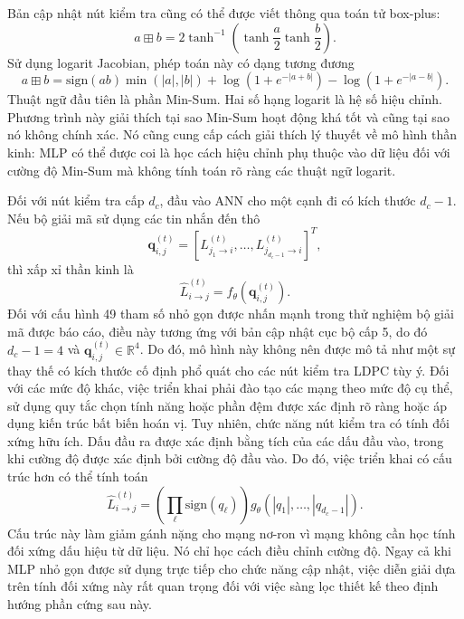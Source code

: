 Bản cập nhật nút kiểm tra cũng có thể được viết thông qua toán tử box-plus:
\begin{equation}
  a\boxplus b
  =
  2\tanh^{-1}\left(\tanh\frac{a}{2}\tanh\frac{b}{2}\right).
\end{equation}
Sử dụng logarit Jacobian, phép toán này có dạng tương đương
\begin{equation}
  a\boxplus b
  =
  \mathrm{sign}(ab)\min(|a|,|b|)
  +\log\left(1+e^{-|a+b|}\right)
  -\log\left(1+e^{-|a-b|}\right).
\end{equation}
Thuật ngữ đầu tiên là phần Min-Sum. Hai số hạng logarit là hệ số hiệu chỉnh. Phương trình này giải thích tại sao Min-Sum hoạt động khá tốt và cũng tại sao nó không chính xác. Nó cũng cung cấp cách giải thích lý thuyết về mô hình thần kinh: MLP có thể được coi là học cách hiệu chỉnh phụ thuộc vào dữ liệu đối với cường độ Min-Sum mà không tính toán rõ ràng các thuật ngữ logarit.

Đối với nút kiểm tra cấp $d_c$, đầu vào ANN cho một cạnh đi có kích thước $d_c-1$. Nếu bộ giải mã sử dụng các tin nhắn đến thô
\begin{equation}
  \mathbf{q}_{i,j}^{(t)}
  =
  [L_{j_1\rightarrow i}^{(t)},\ldots,L_{j_{d_c-1}\rightarrow i}^{(t)}]^T,
\end{equation}
thì xấp xỉ thần kinh là
\begin{equation}
  \hat{L}_{i\rightarrow j}^{(t)}
  =
  f_\theta(\mathbf{q}_{i,j}^{(t)}).
\end{equation}
Đối với cấu hình 49 tham số nhỏ gọn được nhấn mạnh trong thử nghiệm bộ giải mã được báo cáo, điều này tương ứng với bản cập nhật cục bộ cấp 5, do đó $d_c-1=4$ và $\mathbf{q}_{i,j}^{(t)}\in\mathbb{R}^4$. Do đó, mô hình này không nên được mô tả như một sự thay thế có kích thước cố định phổ quát cho các nút kiểm tra LDPC tùy ý. Đối với các mức độ khác, việc triển khai phải đào tạo các mạng theo mức độ cụ thể, sử dụng quy tắc chọn tính năng hoặc phần đệm được xác định rõ ràng hoặc áp dụng kiến ​​trúc bất biến hoán vị.
Tuy nhiên, chức năng nút kiểm tra có tính đối xứng hữu ích. Dấu đầu ra được xác định bằng tích của các dấu đầu vào, trong khi cường độ được xác định bởi cường độ đầu vào. Do đó, việc triển khai có cấu trúc hơn có thể tính toán
\begin{equation}
  \hat{L}_{i\rightarrow j}^{(t)}
  =
  \left(\prod_{\ell}\mathrm{sign}(q_\ell)\right)
  g_\theta(|q_1|,\ldots,|q_{d_c-1}|).
\end{equation}
Cấu trúc này làm giảm gánh nặng cho mạng nơ-ron vì mạng không cần học tính đối xứng dấu hiệu từ dữ liệu. Nó chỉ học cách điều chỉnh cường độ. Ngay cả khi MLP nhỏ gọn được sử dụng trực tiếp cho chức năng cập nhật, việc diễn giải dựa trên tính đối xứng này rất quan trọng đối với việc sàng lọc thiết kế theo định hướng phần cứng sau này.

